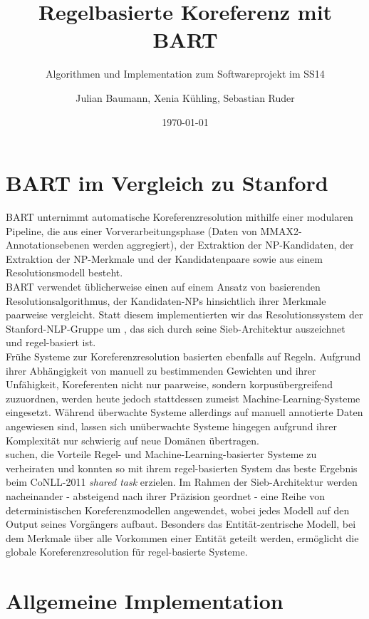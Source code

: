 \documentclass{scrartcl}
\author{Julian Baumann, Xenia Kühling, Sebastian Ruder}
\date{\today}
\title{Regelbasierte Koreferenz mit BART}
\subtitle{Algorithmen und Implementation zum Softwareprojekt im SS14}
\begin{document}
\maketitle
\section{BART im Vergleich zu Stanford}

BART unternimmt automatische Koreferenzresolution mithilfe einer modularen Pipeline, die aus einer Vorverarbeitungsphase (Daten von MMAX2-Annotationsebenen werden aggregiert), der Extraktion der NP-Kandidaten, der Extraktion der NP-Merkmale und der Kandidatenpaare sowie aus einem Resolutionsmodell besteht.\\
BART verwendet üblicherweise einen auf einem Ansatz von  basierenden Resolutionsalgorithmus, der Kandidaten-NPs hinsichtlich ihrer Merkmale paarweise vergleicht. Statt diesem implementierten wir das Resolutionssystem der Stanford-NLP-Gruppe um , das sich durch seine Sieb-Architektur auszeichnet und regel-basiert ist.\\
Frühe Systeme zur Koreferenzresolution basierten ebenfalls auf Regeln. Aufgrund ihrer Abhängigkeit von manuell zu bestimmenden Gewichten und ihrer Unfähigkeit, Koreferenten nicht nur paarweise, sondern korpusübergreifend zuzuordnen, werden heute jedoch stattdessen zumeist Machine-Learning-Systeme eingesetzt. Während überwachte Systeme allerdings auf manuell annotierte Daten angewiesen sind, lassen sich unüberwachte Systeme hingegen aufgrund ihrer Komplexität nur schwierig auf neue Domänen übertragen.\\
 suchen, die Vorteile Regel- und Machine-Learning-basierter Systeme zu verheiraten und konnten so mit ihrem regel-basierten System das beste Ergebnis beim CoNLL-2011 \textit{shared task} erzielen. Im Rahmen der Sieb-Architektur werden nacheinander - absteigend nach ihrer Präzision geordnet - eine Reihe von deterministischen Koreferenzmodellen angewendet, wobei jedes Modell auf den Output seines Vorgängers aufbaut. Besonders das Entität-zentrische Modell, bei dem Merkmale über alle Vorkommen einer Entität geteilt werden, ermöglicht die globale Koreferenzresolution für regel-basierte Systeme.

\section{Allgemeine Implementation}
\end{document}
